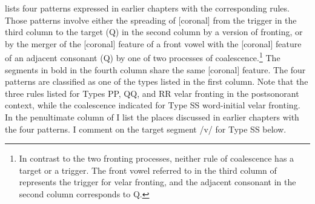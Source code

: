  lists four patterns expressed in earlier chapters with the corresponding rules. Those patterns involve either the spreading of [coronal] from the trigger in the third column to the target (Q) in the second column by a version of  fronting, or by the merger of the [coronal] feature of a front vowel with the [coronal] feature of an adjacent consonant (Q) by one of two processes of coalescence.\footnote{{In contrast to the two  fronting processes, neither rule of coalescence has a target or a trigger. The front vowel referred to in the third column of  represents the trigger for velar fronting, and the adjacent consonant in the second column corresponds to Q.} } The segments in bold in the fourth column share the same [coronal] feature. The four patterns are classified as one of the types listed in the first column. Note that the three rules listed for Types PP, QQ, and RR  velar fronting in the postsonorant context, while the coalescence indicated for Type SS  word-initial velar fronting. In the penultimate column of  I list the places discussed in earlier chapters with the four patterns. I comment on the target segment /v/ for Type SS below.

